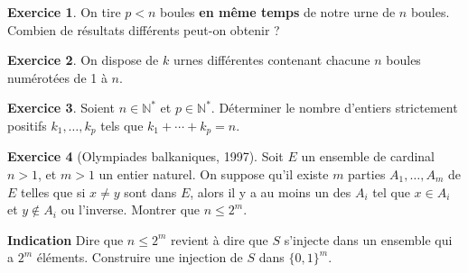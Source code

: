 \documentclass[twoside,11pt]{article}
\newcommand{\N}{\mathbb N}
\theoremstyle{definition}
\newtheorem{exo}{Exercice}
\theoremstyle{remark}
\theoremstyle{theorem}
\begin{document}
\begin{exo}
	On tire $p<n$ boules \textbf{en même temps} de notre urne de $n$ boules. Combien de résultats différents peut-on obtenir ?
\end{exo}

\begin{exo}
	On dispose de $k$ urnes différentes contenant chacune $n$ boules numérotées de 1 à $n$.
\end{exo}

\begin{exo}
	Soient $n\in\N^*$ et $p\in\N^*$. Déterminer le nombre d'entiers strictement positifs $k_1,\ldots,k_p$ tels que $k_1+\cdots+k_p = n$.
\end{exo}

\begin{exo}[Olympiades balkaniques, 1997]
	Soit $E$ un ensemble de cardinal $n>1$, et $m>1$ un entier naturel. On suppose qu'il existe $m$ parties $A_1,\ldots,A_m$ de $E$ telles que si $x\neq y$ sont dans $E$, alors il y a au moins un des $A_i$ tel que $x\in A_i$ et $y\not\in A_i$ ou l'inverse. Montrer que $n\leq 2^m$.
	
	\textbf{Indication} Dire que $n\leq 2^m$ revient à dire que $S$ s'injecte dans un ensemble qui a $2^m$ éléments. Construire une injection de $S$ dans $\{0,1\}^m$.
\end{exo}
\end{document}
